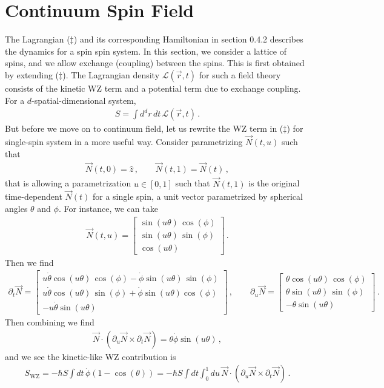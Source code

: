 \documentclass[11pt, onesided]{book}
\theoremstyle{break}
\theoremstyle{break}
\newcommand{\pd}{\partial}
\newcommand{\bmat}[1]{\begin{bmatrix} #1 \end{bmatrix}}
\begin{document}
\section{Continuum Spin Field}
The Lagrangian ($\ddagger$) and its corresponding Hamiltonian in section 0.4.2 describes the dynamics for a spin spin system. In this section, we consider a lattice of spins, and we allow exchange (coupling) between the spins. This is first obtained by extending ($\ddagger$). The Lagrangian density $\mathcal{L}(\vec{r},t)$ for such a field theory consists of the kinetic WZ term and a potential term due to exchange coupling. For a $d$-spatial-dimensional system,
\begin{align*}
S = \int d^dr\,dt\, \mathcal{L}(\vec{r},t)\,.
\end{align*}
But before we move on to continuum field, let us rewrite the WZ term in ($\ddagger$) for single-spin system in a more useful way. Consider parametrizing $\vec{N}(t,u)$ such that 
\begin{align*}
\vec{N}(t,0) = \hat{z}\,,\qquad
\vec{N}(t,1) = \vec{N}(t)\,,
\end{align*}
that is allowing a parametrization $u\in [0,1]$ such that $\vec{N}(t,1)$ is the original time-dependent $\vec{N}(t)$ for a single spin, a unit vector parametrized by spherical angles $\theta$ and $\phi$. For instance, we can take
\begin{align*}
\vec{N}(t,u) = \bmat{\sin(u\theta)\, \cos(\phi)\\ 
\sin(u\theta)\, \sin(\phi)\\
\cos(u\theta)}\,.
\end{align*}
Then we find
\begin{align*}
\pd_t \vec{N} = \bmat{u \dot{\theta}\cos(u \theta)\, \cos(\phi)- \dot{\phi}\sin(u\theta)\,\sin(\phi)\\ u\dot{\theta}\cos(u\theta) \, \sin(\phi) +\dot{\phi} \sin(u\theta) \cos(\phi)\\
-u\dot{\theta}\sin(u\theta)}\,,\qquad
\pd_u\vec{N} = \bmat{\theta\cos(u\theta) \,\cos(\phi)\\
\theta \sin(u\theta)\, \sin(\phi)\\
-\theta \sin(u\theta)}\,.
\end{align*}
Then combining we find 
\begin{align*}
\vec{N}\cdot \left( \pd_u \vec{N}\times \pd_t \vec{N}\right) = \theta \dot{\phi}\sin(u\theta)\,,
\end{align*}
and we see the kinetic-like WZ contribution is 
\begin{align*}
S_{\text{WZ}} = -\hbar S\int dt\, \dot{\phi}(1-\cos(\theta)) = -\hbar S \int dt\int_0^1 du\, \vec{N}\cdot \left(\pd_u \vec{N}\times \pd_t \vec{N}\right)\,.
\end{align*}
\end{document}
